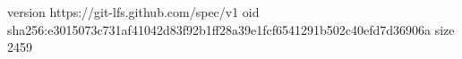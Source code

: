 version https://git-lfs.github.com/spec/v1
oid sha256:e3015073c731af41042d83f92b1ff28a39e1fcf6541291b502c40efd7d36906a
size 2459
